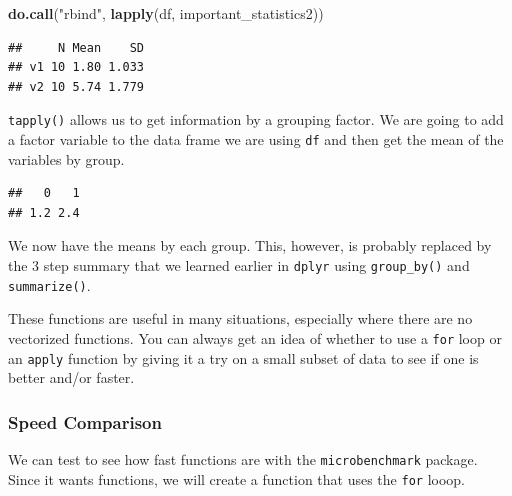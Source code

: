 \documentclass[]{tufte-book}
\newenvironment{Shaded}{}{}
\newcommand{\KeywordTok}[1]{\textcolor[rgb]{0.00,0.44,0.13}{\textbf{#1}}}
\newcommand{\DataTypeTok}[1]{\textcolor[rgb]{0.56,0.13,0.00}{#1}}
\newcommand{\DecValTok}[1]{\textcolor[rgb]{0.25,0.63,0.44}{#1}}
\newcommand{\StringTok}[1]{\textcolor[rgb]{0.25,0.44,0.63}{#1}}
\newcommand{\OtherTok}[1]{\textcolor[rgb]{0.00,0.44,0.13}{#1}}
\newcommand{\OperatorTok}[1]{\textcolor[rgb]{0.40,0.40,0.40}{#1}}
\newcommand{\NormalTok}[1]{#1}
\theoremstyle{definition}
\theoremstyle{definition}
\theoremstyle{remark}
\begin{document}
\begin{Shaded}
\begin{Highlighting}[]
\KeywordTok{do.call}\NormalTok{(}\StringTok{"rbind"}\NormalTok{, }\KeywordTok{lapply}\NormalTok{(df, important_statistics2))}
\end{Highlighting}
\end{Shaded}

\begin{verbatim}
##     N Mean    SD
## v1 10 1.80 1.033
## v2 10 5.74 1.779
\end{verbatim}

\texttt{tapply()} allows us to get information by a grouping factor. We
are going to add a factor variable to the data frame we are using
\texttt{df} and then get the mean of the variables by group.

\begin{Shaded}
\end{Shaded}

\begin{verbatim}
##   0   1 
## 1.2 2.4
\end{verbatim}

We now have the means by each group. This, however, is probably replaced
by the 3 step summary that we learned earlier in \texttt{dplyr} using
\texttt{group\_by()} and \texttt{summarize()}.

These functions are useful in many situations, especially where there
are no vectorized functions. You can always get an idea of whether to
use a \texttt{for} loop or an \texttt{apply} function by giving it a try
on a small subset of data to see if one is better and/or faster.

\subsubsection*{Speed Comparison}\label{speed-comparison}

We can test to see how fast functions are with the
\texttt{microbenchmark} package. Since it wants functions, we will
create a function that uses the \texttt{for} looop.
\end{document}
